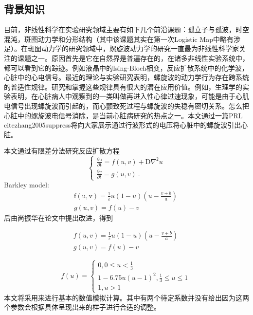

\subsection{背景知识}
目前，非线性科学在实验研究领域主要有如下几个前沿课题：孤立子与孤波，时空混沌，斑图动力学和分形结构（其中该课题其实在第一次Logistic Map中略有涉足）。在斑图动力学的研究领域中，螺旋波动力学的研究一直最为非线性科学家关注的课题之一。原因首先是它在自然界是普遍存在的，在诸多非线性实验系统中，都可以看到它的踪迹。例如液晶中的Ising-Bloch相变，反应扩散系统中的化学波，心脏中的心电信号。最近的理论与实验研究表明，螺旋波的动力学行为存在跨系统的普适性规律。研究和掌握这些规律具有很大的潜在应用价值。例如，生理学的实验表明，在心脏病人中观察到的一类叫做再进入性心律过速现象，可能是由于心肌电信号出现螺旋波而引起的，而心颤致死过程与螺旋波的失稳有密切关系。怎么把心脏中的螺旋波电信号消除，是当前心脏病研究的热点之一。本文通过一篇PRL cite{zhang2005suppress}将向大家展示通过行波形式的电压将心脏中的螺旋波引出心脏。

本文通过有限差分法研究反应扩散方程
\begin{equation}
\left\{\begin{array}{c}
\frac{\partial \mathrm{u}}{\partial \mathrm{t}}=f(u, v)+\mathrm{D} \nabla^{2} u \\
\frac{\partial v}{\partial t}=g(u, v)~.
\end{array}\right.
\end{equation}
Barkley model:
\begin{equation}
\begin{array}{c}
\mathrm{f}(\mathrm{u}, \mathrm{v})=\frac{1}{\varepsilon} u(1-u)\left(u-\frac{v+b}{a}\right) \\
g(u, v)=f(u)-v
\end{array}~
\end{equation}
后由尚振华在论文中提出改进，得到

\begin{equation}
\begin{array}{c}
	f(u, v)=\frac{1}{\varepsilon} u(1-u)\left(u-\frac{v+b}{a}\right)\\
	g(u, v)=f(u)-v
\end{array}~
\end{equation}

\begin{equation}
f(u)=\left\{\begin{array}{c}
0,0 \leq u<\frac{1}{3} \\
1-6.75 u(u-1)^{2}, \frac{1}{3} \leq u \leq 1 \\
1, u>1
\end{array}\right.~
\end{equation}
本文将采用来进行基本的数值模拟计算。其中有两个待定系数并没有给出因为这两个参数会根据具体呈现出来的样子进行合适的调整。
